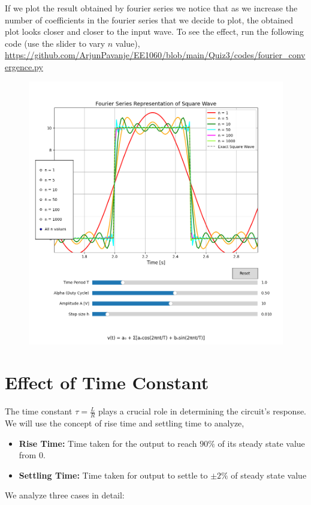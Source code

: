 \documentclass[12pt,a4paper]{report}
\begin{document}
If we plot the result obtained by fourier series we notice that as we increase the number of coefficients in the fourier series that we decide to plot, the obtained plot looks closer and closer to the input wave.  To see the effect, run the following code (use the slider to vary $n$ value), \url{https://github.com/ArjunPavanje/EE1060/blob/main/Quiz3/codes/fourier_convergence.py}
\begin{figure}
    \centering
    \includegraphics[width=1\linewidth]{figs/fourier convergence.png}
    
    \label{fig:enter-label}
\end{figure}


\chapter{Effect of Time Constant}
The time constant $\tau = \frac{L}{R}$ plays a crucial role in determining the circuit's response. We will use the concept of rise time and settling time to analyze, 
\begin{itemize}
    \item \textbf{Rise Time: } Time taken for the output to reach $90\%$ of its steady state value from $0$.
    \item \textbf{Settling Time: } Time taken for output to settle to $\pm 2\%$ of steady state value
\end{itemize}
We analyze three cases in detail:
\end{document}

